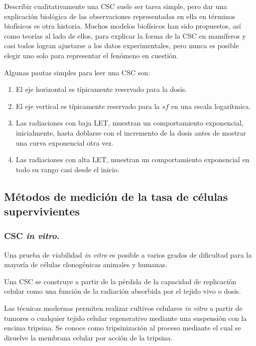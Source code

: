 \documentclass[12pt,letterpaper, oneside]{book}
\begin{document}
				Describir cualitativamente una CSC suele ser tarea simple, pero dar una explicación biológica de las observaciones representadas en ella en términos biofísicos es otra historia\cite{Hall.2000}. Muchos modelos biofísicos han sido propuestos, así como teorías al lado de ellos, para explicar la forma de la CSC en mamíferos y casi todos logran ajustarse a los datos experimentales, pero nunca es posible elegir uno solo para representar el fenómeno en cuestión\cite{Hall.2000}.
				
				Algunas pautas simples para leer una CSC\cite{Hall.2000} son:
				\begin{enumerate}
					\item El eje horizontal es típicamente reservado para la dosis.
					\item El eje vertical es típicamente reservado para la $sf$ en una escala logarítmica.
					\item Las radiaciones con baja LET, muestran un comportamiento exponencial, inicialmente, hasta doblarse con el incremento de la dosis antes de mostrar una curva exponencial otra vez. 
					\item Las radiaciones con alta LET, muestran un comportamiento exponencial en todo su rango casi desde el inicio.
				\end{enumerate}

			\subsection{Métodos de medición de la tasa de células supervivientes}
				\subsubsection{CSC \textit{in vitro}.}
				Una prueba de viabilidad \textit{in vitro} es posible a varios grados de dificultad para la mayoría de células clonogénicas animales y humanas\cite{Tubiana.1990}. 
				
				Una CSC se construye a partir de la pérdida de la capacidad de replicación celular como una función de la radiación absorbida por el tejido vivo o dosis\cite{Hall.2000}. 
				
				Las técnicas modernas permiten realizar cultivos celulares \textit{in vitro} a partir de tumores o cualquier tejido celular regenerativo  mediante una suspensión con la encima tripsina\cite{Hall.2000}. Se conoce como tripsinización al proceso mediante el cual se disuelve la membrana celular por acción de la tripsina\cite{Tubiana.1990, Hall.2000}. 
			
\end{document}
